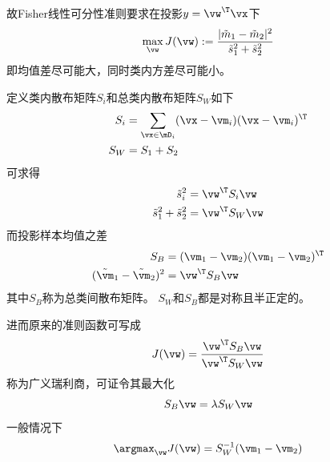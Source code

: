 故Fisher线性可分性准则要求在投影$y=\vw^\T\vx$下
\[\max_{\vw} J(\vw):=\frac{|\tilde{m}_1-\tilde{m}_2|^2}{\tilde{s}_1^2+\tilde{s}_2^2}\]
即均值差尽可能大，同时类内方差尽可能小。

定义类内散布矩阵$S_i$和总类内散布矩阵$S_W$如下
\[\begin{aligned}
S_i &= \sum_{\vx\in\mD_i}(\vx-\vm_i)(\vx-\vm_i)^\T\\
S_W &= S_1+S_2
\end{aligned}\]
可求得
\[\begin{aligned}
\tilde{s}_i^2 &= \vw^\T S_i\vw\\
\tilde{s}_1^2+\tilde{s}_2^2 &= \vw^\T S_W\vw\\
\end{aligned}\]
而投影样本均值之差
\[\begin{aligned}
S_B &= (\vm_1-\vm_2)(\vm_1-\vm_2)^\T\\
(\tilde{\vm}_1-\tilde{\vm}_2)^2 &= \vw^\T S_B\vw
\end{aligned}\]
其中$S_B$称为总类间散布矩阵。
$S_W$和$S_B$都是对称且半正定的。

进而原来的准则函数可写成
\[J(\vw)=\frac{\vw^\T S_B\vw}{\vw^\T S_W\vw}\]
称为广义瑞利商，可证令其最大化
\[S_B\vw=\lambda S_W\vw\]
一般情况下
\[\argmax_{\vw}J(\vw)=S_W^{-1}(\vm_1-\vm_2)\]